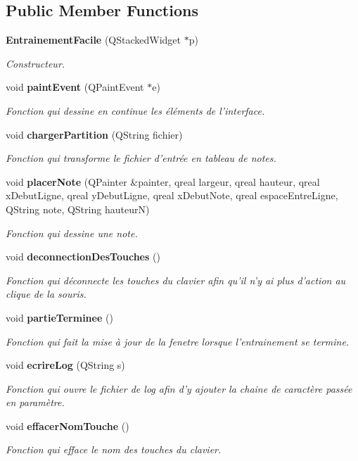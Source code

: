 \subsection*{Public Member Functions}
\begin{DoxyCompactItemize}
\item 
{\bf Entrainement\-Facile} (Q\-Stacked\-Widget $\ast$p)
\begin{DoxyCompactList}\small\item\em Constructeur. \end{DoxyCompactList}\item 
void {\bf paint\-Event} (Q\-Paint\-Event $\ast$e)
\begin{DoxyCompactList}\small\item\em Fonction qui dessine en continue les éléments de l'interface. \end{DoxyCompactList}\item 
void {\bf charger\-Partition} (Q\-String fichier)
\begin{DoxyCompactList}\small\item\em Fonction qui transforme le fichier d'entrée en tableau de notes. \end{DoxyCompactList}\item 
void {\bf placer\-Note} (Q\-Painter \&painter, qreal largeur, qreal hauteur, qreal x\-Debut\-Ligne, qreal y\-Debut\-Ligne, qreal x\-Debut\-Note, qreal espace\-Entre\-Ligne, Q\-String note, Q\-String hauteur\-N)
\begin{DoxyCompactList}\small\item\em Fonction qui dessine une note. \end{DoxyCompactList}\item 
void {\bf deconnection\-Des\-Touches} ()
\begin{DoxyCompactList}\small\item\em Fonction qui déconnecte les touches du clavier afin qu'il n'y ai plus d'action au clique de la souris. \end{DoxyCompactList}\item 
void {\bf partie\-Terminee} ()
\begin{DoxyCompactList}\small\item\em Fonction qui fait la mise à jour de la fenetre lorsque l'entrainement se termine. \end{DoxyCompactList}\item 
void {\bf ecrire\-Log} (Q\-String s)
\begin{DoxyCompactList}\small\item\em Fonction qui ouvre le fichier de log afin d'y ajouter la chaine de caractère passée en paramètre. \end{DoxyCompactList}\item 
void {\bf effacer\-Nom\-Touche} ()
\begin{DoxyCompactList}\small\item\em Fonction qui efface le nom des touches du clavier. \end{DoxyCompactList}\end{DoxyCompactItemize}


